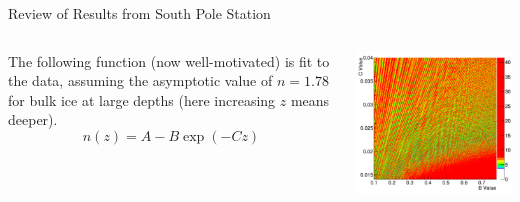 \documentclass{beamer}
\begin{document}
\begin{frame}{Review of Results from South Pole Station}
\begin{columns}[T]
\begin{column}{0.5\textwidth}
The following function (now well-motivated) is fit to the data, assuming the asymptotic value of $n=1.78$ for bulk ice at large depths (here increasing $z$ means deeper).
\begin{equation}
n(z) = A-B\exp(-Cz)
\end{equation}
\end{column}
\begin{column}{0.5\textwidth}
\begin{center}
\includegraphics[width=\textwidth]{southpoleSetup2.png}
\end{center}
\end{column}
\end{columns}
\end{frame}
\end{document}
